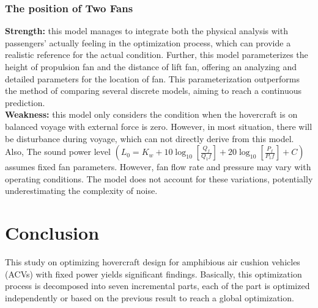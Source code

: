 \subsubsection{The position of Two Fans}
\textbf{Strength:} this model manages to integrate both the physical analysis with passengers' actually feeling in the optimization process, which can provide a realistic reference for the actual condition. Further, this model parameterizes the height of propulsion fan and the distance of lift fan, offering an analyzing and detailed parameters for the location of fan. This parameterization outperforms the method of comparing several discrete models, aiming to reach a continuous prediction.\\
\textbf{Weakness:} this model only considers the condition when the hovercraft is on balanced voyage with external force is zero. However, in most situation, there will be disturbance during voyage, which can not directly derive from this model. Also, The sound power level $( L_0 = K_w + 10 \log_{10} \left[ \frac{Q_f}{Q_1f} \right] + 20 \log_{10} \left[ \frac{P_f}{P_1f} \right] + C) $assumes fixed fan parameters. However, fan flow rate  and pressure may vary with operating conditions. The model does not account for these variations, potentially underestimating the complexity of noise.\\
\section{Conclusion}

This study on optimizing hovercraft design for amphibious air cushion vehicles (ACVs) with fixed power yields significant findings. Basically, this optimization process is decomposed into seven incremental parts, each of the part is optimized independently or based on the previous result to  reach a global optimization.

